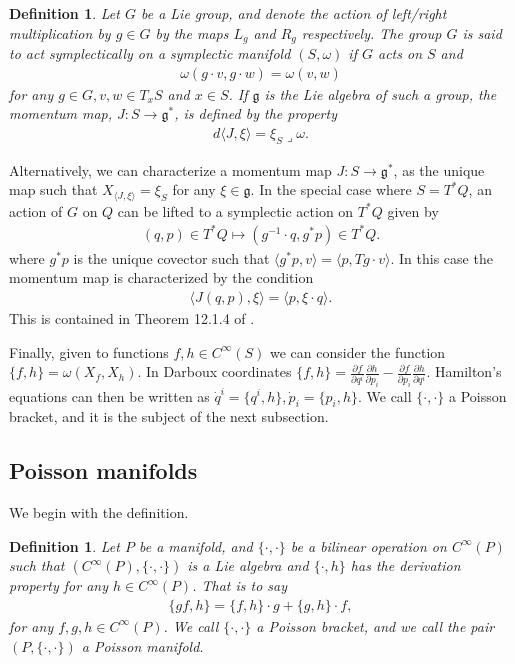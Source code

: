 \documentclass[12pt]{amsart}
\newcommand{\pder}[2]{\ensuremath{\frac{\partial #1}{\partial #2}}}
\newtheorem{defn}[thm]{Definition}
\begin{document}
\begin{defn}
  Let $G$ be a Lie group, and denote the action of left/right multiplication by $g \in G$ by the maps $L_g$ and $R_g$ respectively.
  The group $G$ is said to \emph{act symplectically} on a symplectic manifold $(S,\omega)$ if $G$ acts on $S$ and
  \begin{align*}
    \omega( g \cdot v , g \cdot w) = \omega(v,w)
  \end{align*}
  for any $g \in G, v,w \in T_xS$ and $x \in S$.
  If $\mathfrak{g}$ is the Lie algebra of such a group,
  the \emph{momentum map}, $J:S \to \mathfrak{g}^*$,
  is defined by the property
  \begin{align*}
    d \langle J , \xi \rangle = \xi_S \lrcorner \omega.
  \end{align*}
\end{defn}

Alternatively, we can characterize a momentum map $J: S \to \mathfrak{g}^*$, as the unique map such that $X_{\langle J , \xi \rangle} = \xi_S$ for any $\xi \in \mathfrak{g}$.
In the special case where $S = T^*Q$, an action of $G$ on $Q$ can be lifted to a symplectic action on $T^*Q$ given by
\begin{align*}
  (q,p) \in T^*Q \mapsto (g^{-1} \cdot q , g^* p) \in T^*Q.
\end{align*}
where $g^*p$ is the unique covector such that $\langle g^*p , v \rangle = \langle p , Tg \cdot v \rangle$.
In this case the momentum map is characterized by the condition
\begin{align}
  \langle J(q,p) , \xi \rangle = \langle p , \xi \cdot q \rangle.
  \label{eq:cotangent_momap}
\end{align}
This is contained in Theorem 12.1.4 of \cite{MandS}.

Finally, given to functions $f,h \in C^{\infty}(S)$ we can consider the function $\{ f,h\} = \omega( X_f, X_h)$.
In Darboux coordinates $\{ f , h \} = \pder{f}{q^i} \pder{h}{p_i} - \pder{f}{p_i} \pder{h}{q^i}$.
Hamilton's equations can then be written as $\dot{q}^i = \{ q^i , h \},
\dot{p}_i = \{ p_i , h \}$.
We call $\{ \cdot , \cdot \}$ a Poisson bracket, and it is the subject of
the next subsection.

\subsection{Poisson manifolds}
\label{sec:Poisson}
We begin with the definition.

\begin{defn} \label{defn:Poisson}
  Let $P$ be a manifold, and $\{ \cdot , \cdot \}$ be a bilinear
  operation on $C^{\infty}(P)$ such that 
  $( C^{\infty}(P) , \{ \cdot , \cdot \} )$ is a Lie algebra
  and $\{ \cdot , h \}$ has the derivation property for any $h \in C^{\infty}(P)$.
  That is to say
  \begin{align*}
    \{ gf , h \} = \{ f , h \} \cdot g + \{ g , h \} \cdot f,
  \end{align*}
  for any $f,g,h \in C^{\infty}(P)$.
  We call $\{ \cdot , \cdot \}$ a \emph{Poisson bracket},
  and we call the pair $(P, \{ \cdot , \cdot \})$ a Poisson manifold.
\end{defn}
\end{document}

